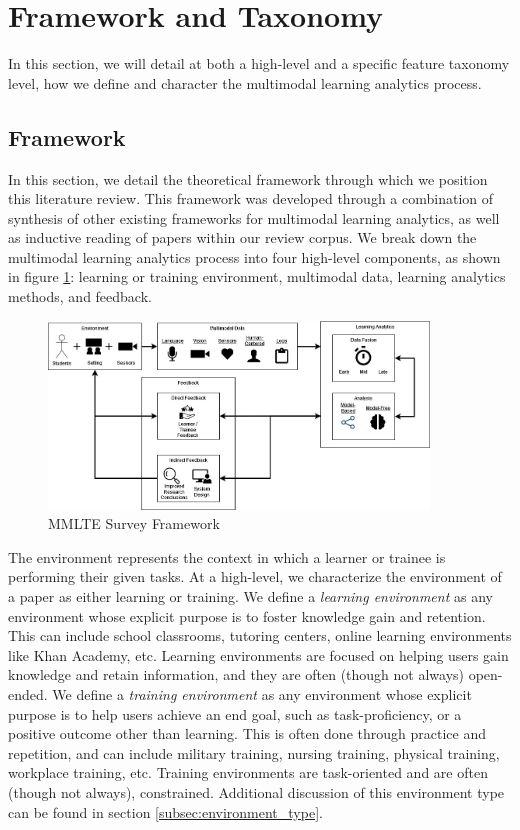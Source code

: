 \documentclass[manuscript,screen,review]{acmart}
\begin{document}
\section{Framework and Taxonomy}

In this section, we will detail at both a high-level and a specific feature taxonomy level, how we define and character the multimodal learning analytics process.

\subsection{Framework} \label{sec:framework}

In this section, we detail the theoretical framework through which we position this literature review. This framework was developed through a combination of synthesis of other existing frameworks for multimodal learning analytics, as well as inductive reading of papers within our review corpus. We break down the multimodal learning analytics process into four high-level components, as shown in figure \ref{fig:framework}: learning or training environment, multimodal data, learning analytics methods, and feedback. 

\begin{figure}[htbp]
    \centering
    \includegraphics[width=0.9\textwidth]{img/Architecture V2.jpg}
    \caption{MMLTE Survey Framework}
    \label{fig:framework}
\end{figure}

The environment represents the context in which a learner or trainee is performing their given tasks. At a high-level, we characterize the environment of a paper as either learning or training. We define a \textit{learning environment} as any environment whose explicit purpose is to foster knowledge gain and retention. This can include school classrooms, tutoring centers, online learning environments like Khan Academy, etc. Learning environments are focused on helping users gain knowledge and retain information, and they are often (though not always) open-ended. We define a \textit{training environment} as any environment whose explicit purpose is to help users achieve an end goal, such as task-proficiency, or a positive outcome other than learning. This is often done through practice and repetition, and can include military training, nursing training, physical training, workplace training, etc. Training environments are task-oriented and are often (though not always), constrained. Additional discussion of this environment type can be found in section \ref{subsec:environment_type}.
\end{document}
